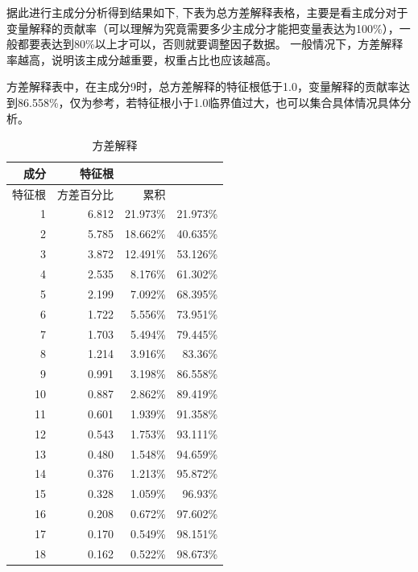 \documentclass[UTF8]{ctexart}
\begin{document}
据此进行主成分分析得到结果如下, 下表为总方差解释表格，主要是看主成分对于变量解释的贡献率（可以理解为究竟需要多少主成分才能把变量表达为100\%），一般都要表达到80\%以上才可以，否则就要调整因子数据。 一般情况下，方差解释率越高，说明该主成分越重要，权重占比也应该越高。

方差解释表中，在主成分9时，总方差解释的特征根低于1.0，变量解释的贡献率达到86.558\%，仅为参考，若特征根小于1.0临界值过大，也可以集合具体情况具体分析。

\begin{table}[!ht]
	\centering
	\caption{方差解释}
	\begin{tabular}{|r|r|r|r|}
		\hline
		成分   & 特征根     & ~        & ~        \\ \hline
		特征根 & 方差百分比 & 累积     & ~        \\ \hline
		1      & 6.812      & 21.973\% & 21.973\% \\ \hline
		2      & 5.785      & 18.662\% & 40.635\% \\ \hline
		3      & 3.872      & 12.491\% & 53.126\% \\ \hline
		4      & 2.535      & 8.176\%  & 61.302\% \\ \hline
		5      & 2.199      & 7.092\%  & 68.395\% \\ \hline
		6      & 1.722      & 5.556\%  & 73.951\% \\ \hline
		7      & 1.703      & 5.494\%  & 79.445\% \\ \hline
		8      & 1.214      & 3.916\%  & 83.36\%  \\ \hline
		9      & 0.991      & 3.198\%  & 86.558\% \\ \hline
		10     & 0.887      & 2.862\%  & 89.419\% \\ \hline
		11     & 0.601      & 1.939\%  & 91.358\% \\ \hline
		12     & 0.543      & 1.753\%  & 93.111\% \\ \hline
		13     & 0.480      & 1.548\%  & 94.659\% \\ \hline
		14     & 0.376      & 1.213\%  & 95.872\% \\ \hline
		15     & 0.328      & 1.059\%  & 96.93\%  \\ \hline
		16     & 0.208      & 0.672\%  & 97.602\% \\ \hline
		17     & 0.170      & 0.549\%  & 98.151\% \\ \hline
		18     & 0.162      & 0.522\%  & 98.673\% \\ \hline

\end{tabular}
\end{table}
\end{document}

